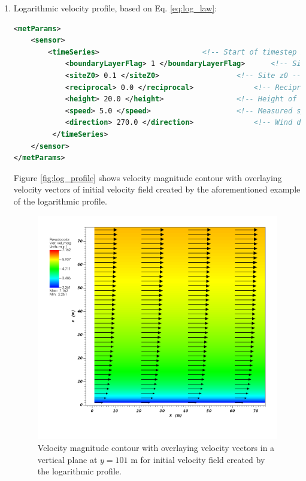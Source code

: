 \begin{enumerate}
\item Logarithmic velocity profile, based on Eq. \ref{eq:log_law}:

\begin{lstlisting}[language=XML]
<metParams>
	<sensor>
	    <timeSeries>						<!-- Start of timestep informastion for a sensor -->
       		<boundaryLayerFlag> 1 </boundaryLayerFlag> 		<!-- Site boundary layer flag (1-log (default), 2-exp, 3-urban canopy, 4-data entry) -->
       		<siteZ0> 0.1 </siteZ0> 					<!-- Site z0 -->
       		<reciprocal> 0.0 </reciprocal> 				<!-- Reciprocal Monin-Obukhov Length (1/m) -->
       		<height> 20.0 </height> 				<!-- Height of the sensor -->
       		<speed> 5.0 </speed> 					<!-- Measured speed at the sensor height -->
       		<direction> 270.0 </direction> 				<!-- Wind direction of sensor -->
    	 </timeSeries>
	</sensor>
</metParams>
\end{lstlisting}

Figure \ref{fig:log_profile} shows velocity magnitude contour with overlaying velocity vectors of initial velocity field created by the aforementioned example of the logarithmic profile.

\begin{figure}[H]
\includegraphics[width=\textwidth,keepaspectratio]{Images/log_y_101.png}
\caption{Velocity magnitude contour with overlaying velocity vectors in a vertical plane at $y=101$ m for initial velocity field created by the logarithmic profile.}
\end{figure}
\noindent


\end{enumerate}
